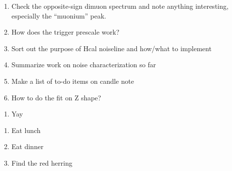

\begin{enumerate}
\item Check the opposite-sign dimuon spectrum and note anything interesting, especially the ``muonium'' peak.
\item How does the trigger prescale work?
\item Sort out the purpose of Hcal noiseline and how/what to implement
\item Summarize work on noise characterization so far
\item Make a list of to-do items on candle note
\item How to do the fit on Z shape?
\end{enumerate}


\begin{enumerate}
\item Yay
\end{enumerate}



\begin{enumerate}
\item Eat lunch
\item Eat dinner
\item Find the red herring
\end{enumerate}


